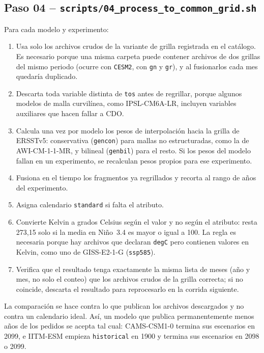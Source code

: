 \subsection{Paso 04 -- \texttt{scripts/04\_process\_to\_common\_grid.sh}}
Para cada modelo y experimento:
\begin{enumerate}[label=(\arabic*)]
\item Usa solo los archivos crudos de la variante de grilla registrada en el catálogo. Es necesario porque una misma carpeta puede contener archivos de dos grillas del mismo periodo (ocurre con \texttt{CESM2}, con \texttt{gn} y \texttt{gr}), y al fusionarlos cada mes quedaría duplicado.
\item Descarta toda variable distinta de \texttt{tos} antes de regrillar, porque algunos modelos de malla curvilínea, como IPSL-CM6A-LR, incluyen variables auxiliares que hacen fallar a CDO.
\item Calcula una vez por modelo los pesos de interpolación hacia la grilla de ERSSTv5: conservativa (\texttt{gencon}) para mallas no estructuradas, como la de AWI-CM-1-1-MR, y bilineal (\texttt{genbil}) para el resto. Si los pesos del modelo fallan en un experimento, se recalculan pesos propios para ese experimento.
\item Fusiona en el tiempo los fragmentos ya regrillados y recorta al rango de años del experimento.
\item Asigna calendario \texttt{standard} si falta el atributo.
\item Convierte Kelvin a grados Celsius según el valor y no según el atributo: resta 273{,}15 solo si la media en Niño~3.4 es mayor o igual a 100. La regla es necesaria porque hay archivos que declaran \texttt{degC} pero contienen valores en Kelvin, como uno de GISS-E2-1-G (\texttt{ssp585}).
\item Verifica que el resultado tenga exactamente la misma lista de meses (año y mes, no solo el conteo) que los archivos crudos de la grilla correcta; si no coincide, descarta el resultado para reprocesarlo en la corrida siguiente.
\end{enumerate}
La comparación se hace contra lo que publican los archivos descargados y no contra un calendario ideal. Así, un modelo que publica permanentemente menos años de los pedidos se acepta tal cual: CAMS-CSM1-0 termina sus escenarios en 2099, e IITM-ESM empieza \texttt{historical} en 1900 y termina sus escenarios en 2098 o 2099.

